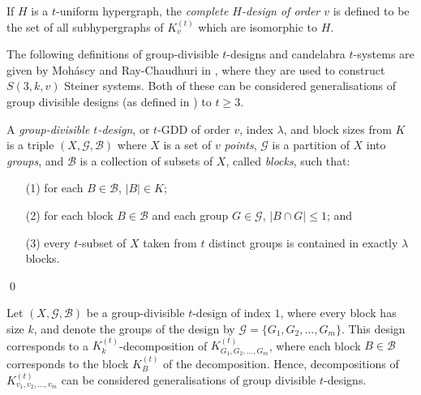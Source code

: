If $H$ is a $t$-uniform hypergraph, the {\em complete $H$-design of order $v$} is defined to be the set of all subhypergraphs of $K_{v}^{(t)}$ which are isomorphic to $H$.



The following definitions of group-divisible $t$-designs and candelabra $t$-systems are given by Moh\'{a}scy and Ray-Chaudhuri in \cite{mohascy}, where they are used to construct $S(3, k, v)$ Steiner systems.
Both of these can be considered generalisations of group divisible designs (as defined in \cite{mull-gron}) to $t \geq 3$.

\begin{definition}
A {\em group-divisible $t$-design}, or $t$-GDD of order $v$, index $\lambda$, and block sizes from $K$ is a triple $(X, \mathcal{G}, \mathcal{B})$ where $X$ is a set of $v$ {\em points}, $\mathcal{G}$ is a partition of $X$ into {\em groups}, and $\mathcal{B}$ is a collection of subsets of $X$, called {\em blocks}, such that:
\begin{enumerate}
    \item[(1)] for each $B \in \mathcal{B}$, $|B| \in K$;
    \item[(2)] for each block $B \in \mathcal{B}$ and each group $G \in \mathcal{G}$, $|B \cap G| \leq 1$; and
    \item[(3)] every $t$-subset of $X$ taken from $t$ distinct groups is contained in exactly $\lambda$ blocks.
\end{enumerate}
\qed
\end{definition}

Let $(X, \mathcal{G}, \mathcal{B})$ be a group-divisible $t$-design of index $1$, where every block has size $k$, and denote the groups of the design by $\mathcal{G} = \{G_1, G_2, \ldots, G_m\}$.
This design corresponds to a $K_{k}^{(t)}$-decomposition of $K_{G_1, G_2, \ldots, G_m}^{(t)}$, where each block $B \in \mathcal{B}$ corresponds to the block $K_{B}^{(t)}$ of the decomposition.
Hence, decompositions of $K_{v_1, v_2, \ldots, v_m}^{(t)}$ can be considered generalisations of group divisible $t$-designs.

